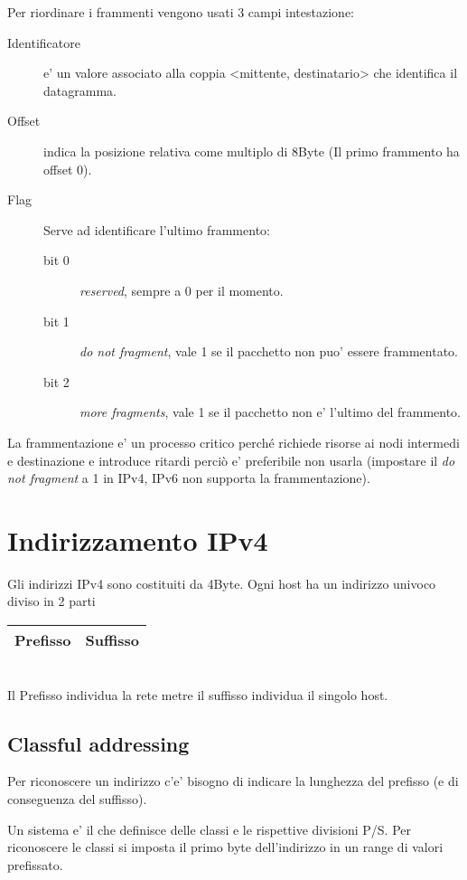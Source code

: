 Per riordinare i frammenti vengono usati 3 campi intestazione:
\begin{description}
    \item[Identificatore] e' un valore associato alla coppia <mittente, destinatario> che identifica il datagramma.
    \item[Offset] indica la posizione relativa come multiplo di 8Byte (Il primo frammento ha offset 0).
    \item[Flag] Serve ad identificare l'ultimo frammento:
    \begin{description}
        \item[bit 0] \textit{reserved}, sempre a 0 per il momento.
        \item[bit 1] \textit{do not fragment}, vale 1 se il pacchetto non puo' essere frammentato.
        \item[bit 2] \textit{more fragments}, vale 1 se il pacchetto non e' l'ultimo del frammento.
    \end{description} 
\end{description}
La frammentazione e' un processo critico perché richiede risorse ai nodi intermedi e destinazione e introduce ritardi perciò e' preferibile non usarla (impostare il \textit{do not fragment} a 1 in IPv4, IPv6 non supporta la frammentazione).
\section{Indirizzamento IPv4}
Gli indirizzi IPv4 sono costituiti da 4Byte.
Ogni host ha un indirizzo univoco diviso in 2 parti
\begin{tabular}{|c|c|}
    \hline
    \hspace{15mm}Prefisso\hspace{15mm}\space&\hspace{5mm}Suffisso\hspace{5mm}\space\\
    \hline
\end{tabular}\\
Il Prefisso individua la rete metre il suffisso individua il singolo host.
\subsection{Classful addressing}
Per riconoscere un indirizzo c'e' bisogno di indicare la lunghezza del prefisso (e di conseguenza del suffisso).

Un sistema e' il  che definisce delle classi e le rispettive divisioni P/S.
Per riconoscere le classi si imposta il primo byte dell'indirizzo in un range di valori prefissato.

